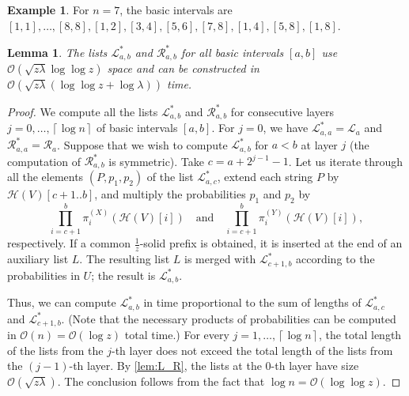 \documentclass{article}
\theoremstyle{plain}
\newtheorem{lemma}[theorem]{Lemma}
\theoremstyle{definition}
\newtheorem{example}[definition]{Example}
\newcommand{\ceil}[1]{\left\lceil #1 \right\rceil}
\newcommand{\Oh}{\mathcal{O}}
\renewcommand{\H}{\mathcal{H}}
\renewcommand{\L}{\mathcal{L}}
\newcommand{\R}{\mathcal{R}}
\newcommand{\Ls}{\mathcal{L}^*}
\newcommand{\Rs}{\mathcal{R}^*}
\newcommand{\fr}{\ensuremath{\frac1z}}
\newcommand{\mayqed}{}
\begin{document}
      \begin{example}
        For $n=7$, the basic intervals are $[1,1],\ldots,[8,8],[1,2],[3,4],[5,6],[7,8],\allowbreak[1,4],[5,8],[1,8]$.
      \end{example}

      \begin{lemma}\label{lem:Ls_Rs}
        The lists $\Ls_{a,b}$ and $\Rs_{a,b}$ for all basic intervals $[a,b]$ use $\Oh(\sqrt{z\lambda}\log\log z)$ space
        and can be constructed in $\Oh(\sqrt{z\lambda}(\log\log z+\log \lambda))$ time.
      \end{lemma}
      \begin{proof}
        We compute all the lists $\Ls_{a,b}$ and $\Rs_{a,b}$ for consecutive layers $j=0,\ldots,\ceil{\log n}$ of basic intervals $[a,b]$.
        For $j=0$, we have $\Ls_{a,a} = \L_a$ and $\Rs_{a,a} = \R_a$.
        Suppose that we wish to compute $\Ls_{a,b}$ for $a<b$ at layer $j$ (the computation of $\Rs_{a,b}$ is symmetric).
        Take $c=a+2^{j-1}-1$.
        Let us iterate through all the elements $(P,p_1,p_2)$ of the list $\Ls_{a,c}$, extend each string $P$ by $\H(V)[c+1..b]$,
        and multiply the probabilities $p_1$ and $p_2$ by
        $$\prod_{i=c+1}^{b} \pi^{(X)}_i(\H(V)[i]) \quad\mbox{and}\quad \prod_{i=c+1}^{b} \pi^{(Y)}_i(\H(V)[i]),$$
        respectively.
        If a common \fr-solid prefix is obtained, it is inserted at the end of an auxiliary list $L$.
        The resulting list $L$ is merged with $\Ls_{c+1,b}$ according to the probabilities in $U$; the result is $\Ls_{a,b}$.

        Thus, we can compute $\Ls_{a,b}$ in time proportional to the sum of lengths of $\Ls_{a,c}$ and $\Ls_{c+1,b}$.
        (Note that the necessary products of probabilities can be computed in $\Oh(n) = \Oh(\log z)$ total time.)
        For every $j=1,\ldots,\ceil{\log n}$, the total length of the lists from the $j$-th layer
        does not exceed the total length of the lists from the $(j-1)$-th layer.
        By \cref{lem:L_R}, the lists at the $0$-th layer have size $\Oh(\sqrt{z\lambda})$.
        The conclusion follows from the fact that $\log n = \Oh(\log\log z)$.
      \mayqed\end{proof}
\end{document}
